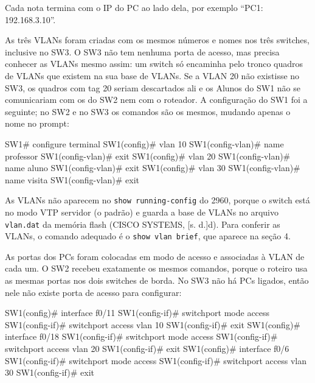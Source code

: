 Cada nota termina com o IP do PC ao lado dela, por exemplo ``PC1: 192.168.3.10''.



As três VLANs foram criadas com os mesmos números e nomes nos três switches, inclusive no SW3. O SW3 não tem nenhuma porta de acesso, mas precisa conhecer as VLANs mesmo assim: um switch só encaminha pelo tronco quadros de VLANs que existem na sua base de VLANs. Se a VLAN 20 não existisse no SW3, os quadros com tag 20 seriam descartados ali e os Alunos do SW1 não se comunicariam com os do SW2 nem com o roteador. A configuração do SW1 foi a seguinte; no SW2 e no SW3 os comandos são os mesmos, mudando apenas o nome no prompt:

\begin{cmd}
SW1# configure terminal
SW1(config)# vlan 10
SW1(config-vlan)# name professor
SW1(config-vlan)# exit
SW1(config)# vlan 20
SW1(config-vlan)# name aluno
SW1(config-vlan)# exit
SW1(config)# vlan 30
SW1(config-vlan)# name visita
SW1(config-vlan)# exit
\end{cmd}

As VLANs não aparecem no \texttt{show running-config} do 2960, porque o switch está no modo VTP servidor (o padrão) e guarda a base de VLANs no arquivo \texttt{vlan.dat} da memória flash (CISCO SYSTEMS, [s. d.]d). Para conferir as VLANs, o comando adequado é o \texttt{show vlan brief}, que aparece na seção 4.


As portas dos PCs foram colocadas em modo de acesso e associadas à VLAN de cada um. O SW2 recebeu exatamente os mesmos comandos, porque o roteiro usa as mesmas portas nos dois switches de borda. No SW3 não há PCs ligados, então nele não existe porta de acesso para configurar:

\begin{cmd}
SW1(config)# interface f0/11
SW1(config-if)# switchport mode access
SW1(config-if)# switchport access vlan 10
SW1(config-if)# exit
SW1(config)# interface f0/18
SW1(config-if)# switchport mode access
SW1(config-if)# switchport access vlan 20
SW1(config-if)# exit
SW1(config)# interface f0/6
SW1(config-if)# switchport mode access
SW1(config-if)# switchport access vlan 30
SW1(config-if)# exit
\end{cmd}


